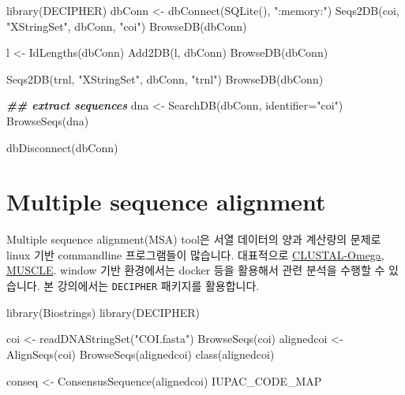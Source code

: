 \documentclass[
]{book}
\newenvironment{Shaded}{\begin{snugshade}}{\end{snugshade}}
\newcommand{\AttributeTok}[1]{\textcolor[rgb]{0.77,0.63,0.00}{#1}}
\newcommand{\DocumentationTok}[1]{\textcolor[rgb]{0.56,0.35,0.01}{\textbf{\textit{#1}}}}
\newcommand{\FunctionTok}[1]{\textcolor[rgb]{0.00,0.00,0.00}{#1}}
\newcommand{\NormalTok}[1]{#1}
\newcommand{\OtherTok}[1]{\textcolor[rgb]{0.56,0.35,0.01}{#1}}
\newcommand{\StringTok}[1]{\textcolor[rgb]{0.31,0.60,0.02}{#1}}
\begin{document}
\begin{Shaded}
\begin{Highlighting}[]
\FunctionTok{library}\NormalTok{(DECIPHER)}
\NormalTok{dbConn }\OtherTok{\textless{}{-}} \FunctionTok{dbConnect}\NormalTok{(}\FunctionTok{SQLite}\NormalTok{(), }\StringTok{":memory:"}\NormalTok{)}
\FunctionTok{Seqs2DB}\NormalTok{(coi, }\StringTok{"XStringSet"}\NormalTok{, dbConn, }\StringTok{"coi"}\NormalTok{)}
\FunctionTok{BrowseDB}\NormalTok{(dbConn)}

\NormalTok{l }\OtherTok{\textless{}{-}} \FunctionTok{IdLengths}\NormalTok{(dbConn)}
\FunctionTok{Add2DB}\NormalTok{(l, dbConn)}
\FunctionTok{BrowseDB}\NormalTok{(dbConn)}

\FunctionTok{Seqs2DB}\NormalTok{(trnl, }\StringTok{"XStringSet"}\NormalTok{, dbConn, }\StringTok{"trnl"}\NormalTok{)}
\FunctionTok{BrowseDB}\NormalTok{(dbConn)}

\DocumentationTok{\#\# extract sequences}
\NormalTok{dna }\OtherTok{\textless{}{-}} \FunctionTok{SearchDB}\NormalTok{(dbConn, }\AttributeTok{identifier=}\StringTok{"coi"}\NormalTok{)}
\FunctionTok{BrowseSeqs}\NormalTok{(dna)}

\FunctionTok{dbDisconnect}\NormalTok{(dbConn)}
\end{Highlighting}
\end{Shaded}

\hypertarget{multiple-sequence-alignment}{%
\section{Multiple sequence alignment}\label{multiple-sequence-alignment}}

Multiple sequence alignment(MSA) tool은 서열 데이터의 양과 계산량의 문제로 linux 기반 commandline 프로그램들이 많습니다. 대표적으로 \href{https://www.ebi.ac.uk/Tools/msa/clustalo/}{CLUSTAL-Omega}, \href{https://www.ebi.ac.uk/Tools/msa/muscle/}{MUSCLE}. window 기반 환경에서는 docker 등을 활용해서 관련 분석을 수행할 수 있습니다. 본 강의에서는 \texttt{DECIPHER} 패키지를 활용합니다.

\begin{Shaded}
\begin{Highlighting}[]
\FunctionTok{library}\NormalTok{(Biostrings)}
\FunctionTok{library}\NormalTok{(DECIPHER)}

\NormalTok{coi }\OtherTok{\textless{}{-}} \FunctionTok{readDNAStringSet}\NormalTok{(}\StringTok{"COI.fasta"}\NormalTok{)}
\FunctionTok{BrowseSeqs}\NormalTok{(coi)}
\NormalTok{alignedcoi }\OtherTok{\textless{}{-}} \FunctionTok{AlignSeqs}\NormalTok{(coi)}
\FunctionTok{BrowseSeqs}\NormalTok{(alignedcoi)}
\FunctionTok{class}\NormalTok{(alignedcoi)}

\NormalTok{conseq }\OtherTok{\textless{}{-}} \FunctionTok{ConsensusSequence}\NormalTok{(alignedcoi)}
\NormalTok{IUPAC\_CODE\_MAP}
\end{Highlighting}
\end{Shaded}
\end{document}
